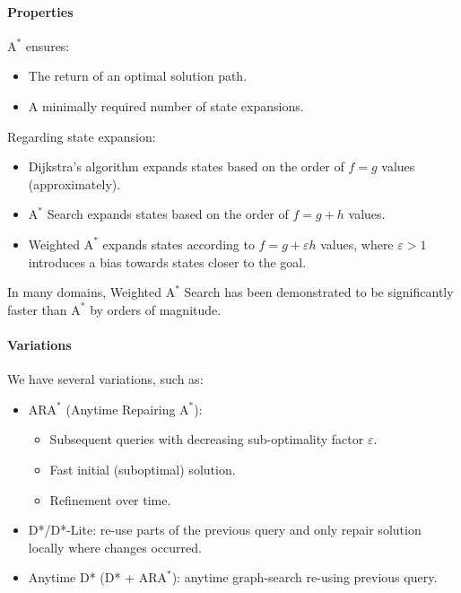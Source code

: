 \paragraph*{Properties}
$\text{A}^\ast$ ensures:
\begin{itemize}
    \item The return of an optimal solution path.
    \item A minimally required number of state expansions.
\end{itemize}
Regarding state expansion:
\begin{itemize}
    \item Dijkstra's algorithm expands states based on the order of $f=g$ values (approximately).
    \item $\text{A}^\ast$ Search expands states based on the order of $f=g+h$ values.
    \item Weighted $\text{A}^\ast$ expands states according to $f=g+\varepsilon h$ values, where $\varepsilon>1$ introduces a bias towards states closer to the goal.
\end{itemize}
In many domains, Weighted $\text{A}^\ast$ Search has been demonstrated to be significantly faster than $\text{A}^\ast$ by orders of magnitude.

\paragraph*{Variations}
We have several variations, such as: 
\begin{itemize}
    \item AR$\text{A}^\ast$ (Anytime Repairing $\text{A}^\ast$):
        \begin{itemize}
            \item Subsequent queries with decreasing sub-optimality factor $\varepsilon$.
            \item Fast initial (suboptimal) solution.
            \item Refinement over time.
        \end{itemize}
    \item D*/D*-Lite: re-use parts of the previous query and only repair solution locally where changes occurred.
    \item Anytime D* (D* + AR$\text{A}^\ast$): anytime graph-search re-using previous query.
\end{itemize}

